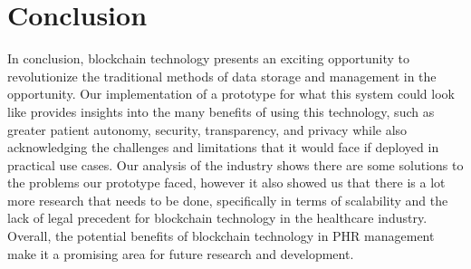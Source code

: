 \documentclass{article}
\begin{document}
\section{Conclusion}
In conclusion, blockchain technology presents an exciting opportunity to revolutionize the traditional methods of data storage and management in the opportunity. Our implementation of a prototype for what this system could look like provides insights into the many benefits of using this technology, such as greater patient autonomy, security, transparency, and privacy while also acknowledging the challenges and limitations that it would face if deployed in practical use cases. Our analysis of the industry shows there are some solutions to the problems our prototype faced, however it also showed us that there is a lot more research that needs to be done, specifically in terms of scalability and the lack of legal precedent for blockchain technology in the healthcare industry. Overall, the potential benefits of blockchain technology in PHR management make it a promising area for future research and development.

\nocite{nakamoto2008bitcoin}
\nocite{zanbaghi_samet_2022}
\nocite{ghadamyari_samet_2020}
\printbibliography
\end{document}
